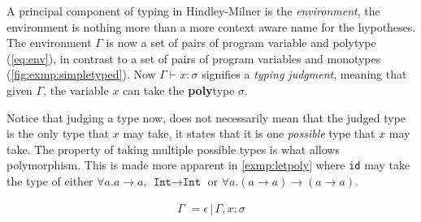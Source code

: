 \documentclass[11pt,oneside,a4paper]{report}
\begin{document}
A principal component of typing in Hindley-Milner is the \textit{environment}, the environment is nothing more than a more context aware name for the hypotheses.
The environment $\Gamma$ is now a set of pairs of program variable and polytype (\autoref{eq:env}), in contrast to a set of pairs of program variables and monotypes (\autoref{fig:exmp:simpletyped}).
Now $\Gamma \vdash x: \sigma$ signifies a \textit{typing judgment}, meaning that given $\Gamma$, the variable $x$ can take the \textbf{poly}type $\sigma$.
\begin{remark}
    \label{remark:judgpoly}
    Notice that judging a type now, does not necessarily mean that the judged type is the only type that $x$ may take, it states that it is one \textit{possible} type that $x$ may take.
    The property of taking multiple possible types is what allows polymorphism.
    This is made more apparent in \autoref{exmp:letpoly} where \texttt{id} may take the type of either $\forall a . a \rightarrow a$, $\texttt{Int} \rightarrow \texttt{Int}$ or $\forall a . (a \rightarrow a) \rightarrow (a \rightarrow a)$.
\end{remark}
\begin{align}
	\Gamma \,\, = \epsilon \,|\, \Gamma, x : \sigma
	\label{eq:env}
\end{align}
\end{document}
